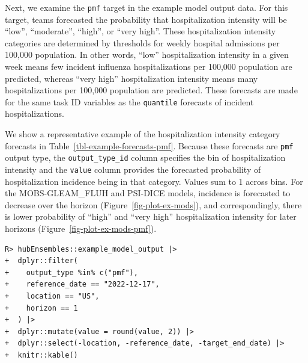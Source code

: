 \documentclass[
  article,
  shortnames,
  notitle]{jss}
\begin{document}
Next, we examine the \texttt{pmf} target in the example model output
data. For this target, teams forecasted the probability that
hospitalization intensity will be ``low'', ``moderate'', ``high'', or
``very high''. These hospitalization intensity categories are determined
by thresholds for weekly hospital admissions per 100,000 population. In
other words, ``low'' hospitalization intensity in a given week means few
incident influenza hospitalizations per 100,000 population are
predicted, whereas ``very high'' hospitalization intensity means many
hospitalizations per 100,000 population are predicted. These forecasts
are made for the same task ID variables as the \texttt{quantile}
forecasts of incident hospitalizations.

We show a representative example of the hospitalization intensity
category forecasts in Table~\ref{tbl-example-forecasts-pmf}. Because
these forecasts are \texttt{pmf} output type, the
\texttt{output\_type\_id} column specifies the bin of hospitalization
intensity and the \texttt{value} column provides the forecasted
probability of hospitalization incidence being in that category. Values
sum to 1 across bins. For the MOBS-GLEAM\_FLUH and PSI-DICE models,
incidence is forecasted to decrease over the horizon
(Figure~\ref{fig-plot-ex-mods}), and correspondingly, there is lower
probability of ``high'' and ``very high'' hospitalization intensity for
later horizons (Figure~\ref{fig-plot-ex-mods-pmf}).

\begin{verbatim}
R> hubEnsembles::example_model_output |>
+  dplyr::filter(
+    output_type %in% c("pmf"),
+    reference_date == "2022-12-17",
+    location == "US",
+    horizon == 1
+  ) |>
+  dplyr::mutate(value = round(value, 2)) |>
+  dplyr::select(-location, -reference_date, -target_end_date) |>
+  knitr::kable()
\end{verbatim}
\end{document}
